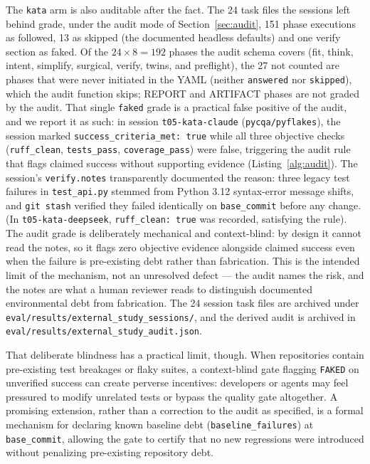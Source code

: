 \documentclass{sbc2019}%
\begin{document}
The \texttt{kata} arm is also auditable after the fact. The 24 task files the
sessions left behind grade, under the audit mode of Section~\ref{sec:audit},
151 phase executions as followed, 13 as skipped (the documented headless
defaults) and one verify section as faked. Of the $24 \times 8 = 192$ phases
the audit schema covers (fit, think, intent, simplify, surgical, verify,
twins, and preflight), the 27 not counted are phases that were never
initiated in the YAML (neither \texttt{answered} nor \texttt{skipped}),
which the audit function skips; REPORT and ARTIFACT phases are not graded
by the audit. That single \texttt{faked} grade
is a practical false positive of the audit, and we report it as such: in
session \texttt{t05-kata-claude}
(\texttt{pycqa/pyflakes}), the session marked \texttt{success\_criteria\_met: true}
while all three objective checks (\texttt{ruff\_clean}, \texttt{tests\_pass},
\texttt{coverage\_pass}) were false, triggering the audit rule that flags
claimed success without supporting evidence (Listing~\ref{alg:audit}). The
session's \texttt{verify.notes} transparently documented the reason: three
legacy test failures in \texttt{test\_api.py} stemmed from Python 3.12
syntax-error message shifts, and \texttt{git stash} verified they failed
identically on \texttt{base\_commit} before any change. (In \texttt{t05-kata-deepseek},
\texttt{ruff\_clean: true} was recorded, satisfying the rule). The audit
grade is deliberately mechanical and context-blind: by design it cannot read
the notes, so it flags zero objective evidence alongside claimed success
even when the failure is pre-existing debt rather than fabrication. This is
the intended limit of the mechanism, not an unresolved defect --- the audit
names the risk, and the notes are what a human reviewer
reads to distinguish documented environmental debt from fabrication. The
24 session task files are archived
under
\texttt{eval/\allowbreak results/\allowbreak external\_study\_sessions/},
and the derived audit is archived in
\texttt{eval/\allowbreak results/\allowbreak external\_study\_audit.json}.

That deliberate blindness has a practical limit, though. When repositories contain
pre-existing test breakages or flaky suites, a context-blind gate flagging
\texttt{FAKED} on unverified success can create perverse incentives: developers
or agents may feel pressured to modify unrelated tests or bypass the quality gate
altogether. A promising extension, rather than a correction to the audit as
specified, is a formal mechanism for declaring
known baseline debt (\texttt{baseline\_failures}) at \texttt{base\_commit},
allowing the gate to certify that no new regressions were introduced without
penalizing pre-existing repository debt.
\end{document}
